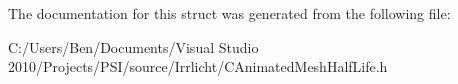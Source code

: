 The documentation for this struct was generated from the following file\-:\begin{DoxyCompactItemize}
\item 
C\-:/\-Users/\-Ben/\-Documents/\-Visual Studio 2010/\-Projects/\-P\-S\-I/source/\-Irrlicht/C\-Animated\-Mesh\-Half\-Life.\-h\end{DoxyCompactItemize}
